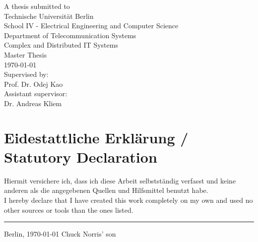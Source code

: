 \documentclass[twoside,11pt,titlepage,a4paper,english,bibliography=totocnumbered,listof=numbered]{scrbook}
\begin{document}
\begin{titlepage}
\begin{center}
		\vspace{1.8cm} 
	 	A thesis submitted to\\
		\vspace{0.5cm}
		Technische Universität Berlin\\
		School IV - Electrical Engineering and Computer Science\\
		Department of Telecommunication Systems\\
		Complex and Distributed IT Systems\\
		\vspace{0.5cm}
		Master Thesis\\
		\vspace{2.0cm}
		\today\\
		\vspace{1.8cm}
		\large
		Supervised by:\\
		Prof. Dr. Odej Kao\\
		\vspace{0.8cm}
		Assistant supervisor:\\
		Dr. Andreas Kliem
		\end{center}
\end{titlepage}
\thispagestyle{empty}

\cleardoublepage

\newpage
\section*{\thispagestyle{empty}Eidestattliche Erklärung / Statutory Declaration}
Hiermit versichere ich, dass ich diese Arbeit selbst\-ständig verfasst und keine anderen als die angegebenen Quellen und Hilfsmittel benutzt habe. \\

\noindent I hereby declare that I have created this work completely on my own and used no other sources or tools than the ones listed.

\vspace{30 mm}
\begin{flushright}

\rule{90mm}{1pt}

Berlin, \today \hspace{15 mm} Chuck Norris' son
\end{flushright}
\clearpage

\cleardoublepage{}

\newpage
\end{document}
